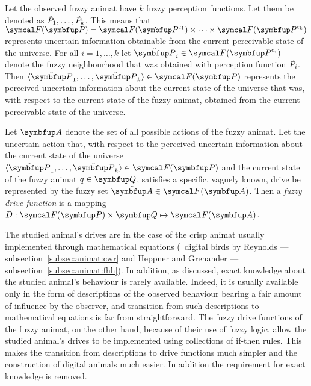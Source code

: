 Let the observed fuzzy animat have $k$ fuzzy perception functions. Let them be denoted as $\tilde{P}_1,\ldots,\tilde{P}_k$. This means that $\fpowset{\set{P}}=\fpowset{\set{P}^{\mathrm{c}_1}} \times \cdots \times \fpowset{\set{P}^{\mathrm{c}_k}}$ represents uncertain information obtainable from the current perceivable state of the universe. For all $i=1,\ldots,k$ let $\fset{P}_i \in \fpowset{\set{P}^{\mathrm{c}_i}}$ denote the fuzzy neighbourhood that was obtained with perception function $\tilde{P}_i$. Then $\langle \fset{P}_1,\ldots,\fset{P}_k \rangle \in \fpowset{\set{P}}$ represents the perceived uncertain information about the current state of the universe that was, with respect to the current state of the fuzzy animat, obtained from the current perceivable state of the universe.

\begin{definition}
	\label{def:fuzzyAnimat:Dj}
	Let $\set{A}$ denote the set of all possible actions of the fuzzy animat. Let the uncertain action that, with respect to the perceived uncertain information about the current state of the universe $\langle \fset{P}_1,\ldots,\fset{P}_k \rangle \in \fpowset{\set{P}}$ and the current state of the fuzzy animat $q \in \set{Q}$, satisfies a specific, vaguely known, drive be represented by the fuzzy set $\fset{A} \in \fpowset{\set{A}}$. Then a \emph{fuzzy drive function} is a mapping $\ffunc{D}: \fpowset{\set{P}} \times \set{Q} \mapsto \fpowset{\set{A}}$.
\end{definition}

The studied animal's drives are in the case of the crisp animat  usually implemented through mathematical equations (\eg\ digital birds by Reynolds \cite{reynolds:1987,reynolds:1999}---subsection~\ref{subsec:animat:cwr} and Heppner and Grenander \cite{heppner:1990}---subsection~\ref{subsec:animat:fhh}). In addition, as discussed, exact knowledge about the studied animal's behaviour is rarely available. Indeed, it is usually available only in the form of descriptions of the observed behaviour bearing a fair amount of influence by the observer, and transition from such descriptions to mathematical equations is far from straightforward. The fuzzy drive functions of the fuzzy animat, on the other hand, because of their use of fuzzy logic, allow the studied animal's drives to be implemented using collections of if-then rules. This makes the transition from descriptions to drive functions much simpler and the construction of digital animals much easier. In addition the requirement for exact knowledge is removed.
 
